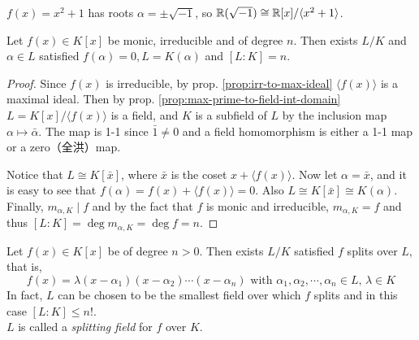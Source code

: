 \begin{example}
  $f(x) = x^2 + 1$ has roots $\alpha = \pm \sqrt{-1}$, so $\mathbb{R}(\sqrt{-1}) \cong \mathbb{R}[x] / \langle x^2 + 1 \rangle$.
\end{example}

\begin{theorem} \label{thm:field-ext-1}
  Let $f(x) \in K[x]$ be monic, irreducible and of degree $n$. Then exists $L / K$ and $\alpha \in L$
  satisfied $f(\alpha) = 0, L = K(\alpha)$ and $[L: K] = n$.
\end{theorem}

\begin{proof}
  Since $f(x)$ is irreducible, by prop. \ref{prop:irr-to-max-ideal} $\langle f(x) \rangle$ is a maximal ideal.
  Then by prop. \ref{prop:max-prime-to-field-int-domain} $L = K[x] / \langle f(x) \rangle$ is a field, and $K$ is a subfield
  of $L$ by the inclusion map $\alpha \mapsto \bar\alpha$. The map is 1-1 since $\bar{1} \neq 0$ and
  a field homomorphism is either a 1-1 map or a zero（全洪）map.

  Notice that $L \cong K[\bar{x}]$, where $\bar{x}$ is the coset $x + \langle f(x) \rangle$.
  Now let $\alpha = \bar{x}$, and it is easy to see that $f(\alpha) = f(x) + \langle f(x) \rangle = 0$.
  Also $L \cong K[\bar{x}] \cong K(\alpha)$. Finally, $m_{\alpha, K} \mid f$ and by the fact that
  $f$ is monic and irreducible, $m_{\alpha, K} = f$ and thus $[L: K] = \deg m_{\alpha, K} = \deg f = n$.
\end{proof}

\begin{theorem}
  Let $f(x) \in K[x]$ be of degree $n > 0$. Then exists $L/K$ satisfied $f$ splits over $L$,
  that is,
  \[ f(x) = \lambda (x - \alpha_1) (x - \alpha_2) \cdots (x - \alpha_n) \text{ with }
    \alpha_1, \alpha_2, \cdots, \alpha_n \in L,\, \lambda \in K \]
  In fact, $L$ can be chosen to be the smallest field over which $f$ splits and in this case $[L : K] \leq n!$.\\
  $L$ is called a \emph{splitting field}  for $f$ over $K$.
\end{theorem}

